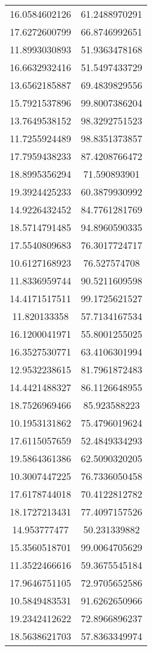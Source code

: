 \begin{table}
\begin{tabular}{cc}
16.0584602126 & 61.2488970291 \\
17.6272600799 & 66.8746992651 \\
11.8993030893 & 51.9363478168 \\
16.6632932416 & 51.5497433729 \\
13.6562185887 & 69.4839829556 \\
15.7921537896 & 99.8007386204 \\
13.7649538152 & 98.3292751523 \\
11.7255924489 & 98.8351373857 \\
17.7959438233 & 87.4208766472 \\
18.8995356294 & 71.590893901 \\
19.3924425233 & 60.3879930992 \\
14.9226432452 & 84.7761281769 \\
18.5714791485 & 94.8960590335 \\
17.5540809683 & 76.3017724717 \\
10.6127168923 & 76.527574708 \\
11.8336959744 & 90.5211609598 \\
14.4171517511 & 99.1725621527 \\
11.820133358 & 57.7134167534 \\
16.1200041971 & 55.8001255025 \\
16.3527530771 & 63.4106301994 \\
12.9532238615 & 81.7961872483 \\
14.4421488327 & 86.1126648955 \\
18.7526969466 & 85.923588223 \\
10.1953131862 & 75.4796019624 \\
17.6115057659 & 52.4849334293 \\
19.5864361386 & 62.5090320205 \\
10.3007447225 & 76.7336050458 \\
17.6178744018 & 70.4122812782 \\
18.1727213431 & 77.4097157526 \\
14.953777477 & 50.231339882 \\
15.3560518701 & 99.0064705629 \\
11.3522466616 & 59.3675545184 \\
17.9646751105 & 72.9705652586 \\
10.5849483531 & 91.6262650966 \\
19.2342412622 & 72.8966896237 \\
18.5638621703 & 57.8363349974 \\

\end{tabular}
\end{table}
